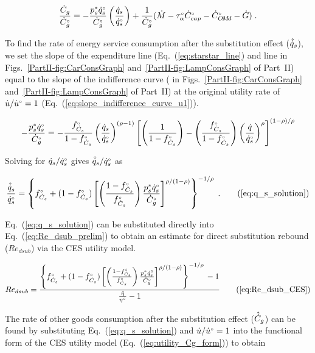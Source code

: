 \begin{equation} \label{eq:starstar_line}
  \frac{\dot{C}_g}{{}{\dot{C}}^{\scriptscriptstyle \circ}_g} =
      -\frac{{p}^*_s {}{\dot{q}}^{\scriptscriptstyle \circ}_s}
            {{}{\dot{C}}^{\scriptscriptstyle \circ}_g}
        \left(  \frac{\dot{q}_s}{{}{\dot{q}}^{\scriptscriptstyle \circ}_s} \right)
      + \frac{1}{{}{\dot{C}}^{\scriptscriptstyle \circ}_g}
        (\dot{M} - {}{\tau}^{\scriptscriptstyle \circ}_\alpha {}{\dot{C}}^{\scriptscriptstyle \circ}_{cap} - {}{\dot{C}}^{\scriptscriptstyle \circ}_{O\!M\!d} - \dot{G}) \; .
\end{equation}

To find the rate of energy service consumption after the substitution effect
($\hat{\dot{q}}_s$), we set the slope of the
expenditure line (Eq.~(\ref{eq:starstar_line})
and line \starstar{} in
Figs.~\ref{PartII-fig:CarConsGraph}
and~\ref{PartII-fig:LampConsGraph} of Part~II)
equal to the slope of the
indifference curve
(\iicirc{} in
Figs.~\ref{PartII-fig:CarConsGraph}
and~\ref{PartII-fig:LampConsGraph} of Part~II)
at the original utility rate of $\dot{u}/{}{\dot{u}}^{\scriptscriptstyle \circ} = 1$ (Eq.~(\ref{eq:slope_indifference_curve_u1})).

\begin{equation}
  -\frac{\aempl{p}_s \rbempl{q}_s}
        {\rbempl{C}_g} =
    -\frac{\fCs}{1 - \fCs} \left( \frac{\rate{q}_s}{\rbempl{q}_s} \right)^{(\rho -1)} %
        \left[ \left( \frac{1}{1 - \fCs} \right)
                - \left( \frac{\fCs}{1 - \fCs} \right)
                          \left( \frac{\rate{q}}{\rbempl{q}_s} \right)^\rho \right]^{(1 - \rho)/\rho}
\end{equation}

Solving for $\dot{q}_s/{}{\dot{q}}^{\scriptscriptstyle \circ}_s$ gives $\hat{\dot{q}}_s/{}{\dot{q}}^{\scriptscriptstyle \circ}_s$ as

\begin{equation}
  \frac{\rasub{q}_s}{\rbempl{q}_s} = \qssolution{} \; . \tag{\ref{eq:q_s_solution}}
\end{equation}

Eq.~(\ref{eq:q_s_solution}) can be substituted directly
into Eq.~(\ref{eq:Re_dsub_prelim})
to obtain an estimate for direct substitution rebound ($Re_{dsub}$)
via the CES utility model.

\begin{equation}
  Re_{dsub} = \RedsubCES{} \tag{\ref{eq:Re_dsub_CES}}
\end{equation}

The rate of other goods consumption after the substitution effect ($\hat{\dot{C}}_g$)
can be found by substituting Eq.~(\ref{eq:q_s_solution}) and
$\dot{u}/{}{\dot{u}}^{\scriptscriptstyle \circ} = 1$
into the functional form of the CES utility model (Eq.~(\ref{eq:utility_Cg_form}))
to obtain

